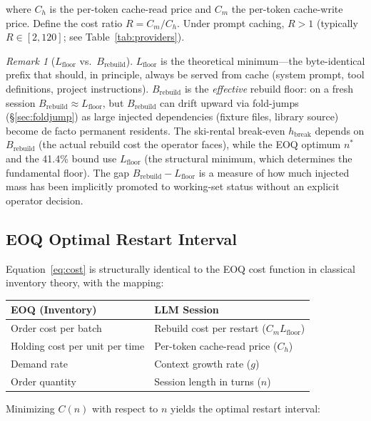 \documentclass[11pt]{article}
\theoremstyle{definition}
\theoremstyle{remark}
\newtheorem{remark}[theorem]{Remark}
\begin{document}
where $C_h$ is the per-token cache-read price and $C_m$ the per-token cache-write price. Define the cost ratio $R = C_m / C_h$. Under prompt caching, $R > 1$ (typically $R \in [2, 120]$; see Table~\ref{tab:providers}).

\begin{remark}[$L_{\text{floor}}$ vs.\ $B_{\text{rebuild}}$]
$L_{\text{floor}}$ is the theoretical minimum---the byte-identical prefix that should, in principle, always be served from cache (system prompt, tool definitions, project instructions). $B_{\text{rebuild}}$ is the \emph{effective} rebuild floor: on a fresh session $B_{\text{rebuild}} \approx L_{\text{floor}}$, but $B_{\text{rebuild}}$ can drift upward via fold-jumps (\S\ref{sec:foldjump}) as large injected dependencies (fixture files, library source) become de facto permanent residents. The ski-rental break-even $h_{\text{break}}$ depends on $B_{\text{rebuild}}$ (the actual rebuild cost the operator faces), while the EOQ optimum $n^*$ and the 41.4\% bound use $L_{\text{floor}}$ (the structural minimum, which determines the fundamental floor). The gap $B_{\text{rebuild}} - L_{\text{floor}}$ is a measure of how much injected mass has been implicitly promoted to working-set status without an explicit operator decision.
\end{remark}

\subsection{EOQ Optimal Restart Interval}

Equation~\ref{eq:cost} is structurally identical to the EOQ cost function in classical inventory theory, with the mapping:

\begin{center}
\begin{tabular}{ll}
\toprule
EOQ (Inventory) & LLM Session \\
\midrule
Order cost per batch & Rebuild cost per restart ($C_m L_{\text{floor}}$) \\
Holding cost per unit per time & Per-token cache-read price ($C_h$) \\
Demand rate & Context growth rate ($g$) \\
Order quantity & Session length in turns ($n$) \\
\bottomrule
\end{tabular}
\end{center}

Minimizing $C(n)$ with respect to $n$ yields the optimal restart interval:
\end{document}
